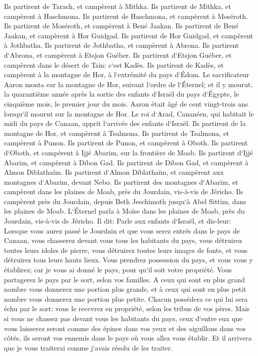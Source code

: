 \verse Ils partirent de Tarach, et campèrent à Mithka. 
\verse Ils partirent de Mithka, et campèrent à Haschmona. 
\verse Ils partirent de Haschmona, et campèrent à Moséroth. 
\verse Ils partirent de Moséroth, et campèrent à Bené Jaakan. 
\verse Ils partirent de Bené Jaakan, et campèrent à Hor Guidgad. 
\verse Ils partirent de Hor Guidgad, et campèrent à Jothbatha. 
\verse Ils partirent de Jothbatha, et campèrent à Abrona. 
\verse Ils partirent d`Abrona, et campèrent à Etsjon Guéber. 
\verse Ils partirent d`Etsjon Guéber, et campèrent dans le désert de Tsin: c`est Kadès. 
\verse Ils partirent de Kadès, et campèrent à la montagne de Hor, à l`extrémité du pays d`Édom. 
\verse Le sacrificateur Aaron monta sur la montagne de Hor, suivant l`ordre de l`Éternel; et il y mourut, la quarantième année après la sortie des enfants d`Israël du pays d`Égypte, le cinquième mois, le premier jour du mois. 
\verse Aaron était âgé de cent vingt-trois ans lorsqu`il mourut sur la montagne de Hor. 
\verse Le roi d`Arad, Cananéen, qui habitait le midi du pays de Canaan, apprit l`arrivée des enfants d`Israël. 
\verse Ils partirent de la montagne de Hor, et campèrent à Tsalmona. 
\verse Ils partirent de Tsalmona, et campèrent à Punon. 
\verse Ils partirent de Punon, et campèrent à Oboth. 
\verse Ils partirent d`Oboth, et campèrent à Ijjé Abarim, sur la frontière de Moab. 
\verse Ils partirent d`Ijjé Abarim, et campèrent à Dibon Gad. 
\verse Ils partirent de Dibon Gad, et campèrent à Almon Diblathaïm. 
\verse Ils partirent d`Almon Diblathaïm, et campèrent aux montagnes d`Abarim, devant Nebo. 
\verse Ils partirent des montagnes d`Abarim, et campèrent dans les plaines de Moab, près du Jourdain, vis-à-vis de Jéricho. 
\verse Ils campèrent près du Jourdain, depuis Beth Jeschimoth jusqu`à Abel Sittim, dans les plaines de Moab. 
\verse L`Éternel parla à Moïse dans les plaines de Moab, près du Jourdain, vis-à-vis de Jéricho. Il dit: 
\verse Parle aux enfants d`Israël, et dis-leur: Lorsque vous aurez passé le Jourdain et que vous serez entrés dans le pays de Canaan, 
\verse vous chasserez devant vous tous les habitants du pays, vous détruirez toutes leurs idoles de pierre, vous détruirez toutes leurs images de fonte, et vous détruirez tous leurs hauts lieux. 
\verse Vous prendrez possession du pays, et vous vous y établirez; car je vous ai donné le pays, pour qu`il soit votre propriété. 
\verse Vous partagerez le pays par le sort, selon vos familles. A ceux qui sont en plus grand nombre vous donnerez une portion plus grande, et à ceux qui sont en plus petit nombre vous donnerez une portion plus petite. Chacun possédera ce qui lui sera échu par le sort: vous le recevrez en propriété, selon les tribus de vos pères. 
\verse Mais si vous ne chassez pas devant vous les habitants du pays, ceux d`entre eux que vous laisserez seront comme des épines dans vos yeux et des aiguillons dans vos côtés, ils seront vos ennemis dans le pays où vous allez vous établir. 
\verse Et il arrivera que je vous traiterai comme j`avais résolu de les traiter. 

